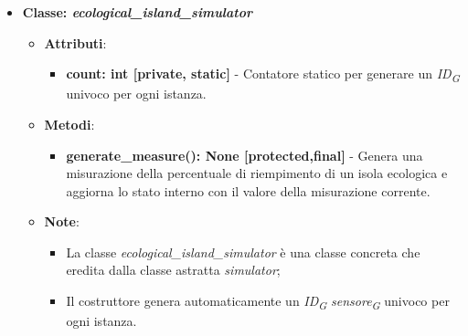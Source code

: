 \begin{itemize}
    \item{\textbf{Classe: \textit{ecological\_island\_simulator}}}
    \begin{itemize}
        \item \textbf{Attributi}: 
        \begin{itemize}
            \item \textbf{count: int [private, static]} - Contatore statico per generare un \textit{ID}\textsubscript{\textit{G}} univoco per ogni istanza.
        \end{itemize}
        \item \textbf{Metodi}: 
        \begin{itemize}
            \item \textbf{generate\_measure(): None [protected,final]} - Genera una misurazione della percentuale di riempimento di un isola ecologica e aggiorna lo stato interno con il valore della misurazione corrente.
        \end{itemize}
        \item \textbf{Note}:
        \begin{itemize}
            \item La classe \textit{ecological\_island\_simulator} è una classe concreta che eredita dalla classe astratta \textit{simulator};
            \item Il costruttore genera automaticamente un \textit{ID}\textsubscript{\textit{G}} \textit{sensore}\textsubscript{\textit{G}} univoco per ogni istanza.
        \end{itemize}
    \end{itemize}


\end{itemize}
